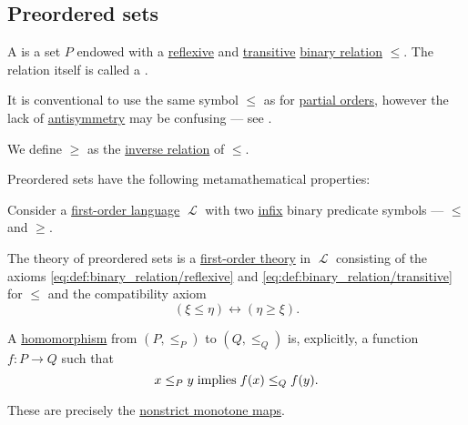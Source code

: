 \subsection{Preordered sets}\label{subsec:preordered_sets}

\begin{definition}\label{def:preordered_set}
  A  is a set \( P \) endowed with a \hyperref[def:binary_relation/reflexive]{reflexive} and \hyperref[def:binary_relation/transitive]{transitive} \hyperref[def:binary_relation]{binary relation} \( \leq \). The relation itself is called a .

  It is conventional to use the same symbol \( \leq \) as for \hyperref[def:partially_ordered_set]{partial orders}, however the lack of \hyperref[def:binary_relation/antisymmetric]{antisymmetry} may be confusing --- see .

  We define \( \geq \) as the \hyperref[def:binary_relation/converse]{inverse relation} of \( \leq \).

  Preordered sets have the following metamathematical properties:
  \begin{thmenum}
     Consider a \hyperref[def:first_order_language]{first-order language} \( \mscrL \) with two \hyperref[rem:first_order_formula_conventions/infix]{infix} binary predicate symbols --- \( \leq \) and \( \geq \).

    The theory of preordered sets is a \hyperref[def:first_order_theory]{first-order theory} in \( \mscrL \) consisting of the axioms \eqref{eq:def:binary_relation/reflexive} and \eqref{eq:def:binary_relation/transitive} for \( \leq \) and the compatibility axiom
    \begin{equation}\label{eq:def:preordered_set/theory}
      (\xi \leq \eta) \leftrightarrow (\eta \geq \xi).
    \end{equation}

     A \hyperref[def:first_order_homomorphism]{homomorphism} from \( (P, \leq_P) \) to \( (Q, \leq_Q) \) is, explicitly, a function \( f: P \to Q \) such that
    \begin{equation}\label{eq:def:preordered_set/homomorphism}
      x \leq_P y \T{implies} f(x) \leq_Q f(y).
    \end{equation}

    These are precisely the \hyperref[eq:def:partially_ordered_set/homomorphism/nonstrict]{nonstrict monotone maps}.


\end{thmenum}
\end{definition}

